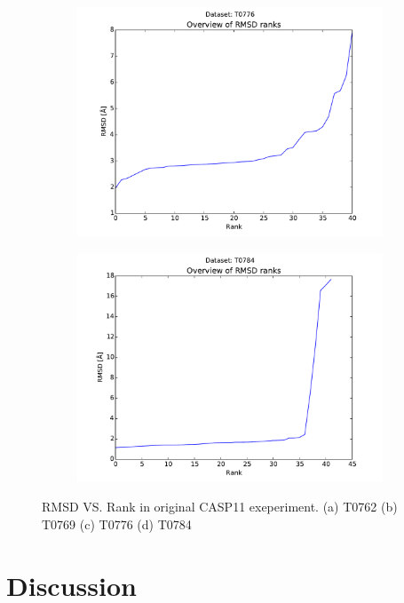 \documentclass[11pt,a4paper]{article}
\renewcommand{\(}{\left (}
\renewcommand{\)}{\right )}
\begin{document}
\begin{figure}[!h]
\begin{subfigure}{.5\textwidth}
		\subcaption{}
	\end{subfigure}
	\begin{subfigure}{.5\textwidth}
		\includegraphics[width=\textwidth]{../results/rank_T0776}
		\subcaption{}
	\end{subfigure}
	\begin{subfigure}{.5\textwidth}
		\includegraphics[width=\textwidth]{../results/rank_T0784}
		\subcaption{}
	\end{subfigure}
	\caption{RMSD VS. Rank in original CASP11 exeperiment. (a) T0762 (b) T0769 (c) T0776 (d) T0784}
\end{figure}

\section{Discussion}

%



\end{document}
